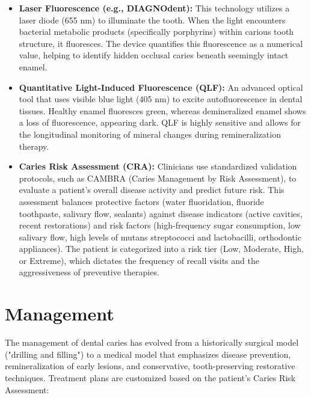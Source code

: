 \begin{itemize}
\begin{itemize}
    \end{itemize}
    \item \textbf{Laser Fluorescence (e.g., DIAGNOdent):} This technology utilizes a laser diode (655 nm) to illuminate the tooth. When the light encounters bacterial metabolic products (specifically porphyrins) within carious tooth structure, it fluoresces. The device quantifies this fluorescence as a numerical value, helping to identify hidden occlusal caries beneath seemingly intact enamel.
    \item \textbf{Quantitative Light-Induced Fluorescence (QLF):} An advanced optical tool that uses visible blue light (405 nm) to excite autofluorescence in dental tissues. Healthy enamel fluoresces green, whereas demineralized enamel shows a loss of fluorescence, appearing dark. QLF is highly sensitive and allows for the longitudinal monitoring of mineral changes during remineralization therapy.
    \item \textbf{Caries Risk Assessment (CRA):} Clinicians use standardized validation protocols, such as CAMBRA (Caries Management by Risk Assessment), to evaluate a patient's overall disease activity and predict future risk. This assessment balances protective factors (water fluoridation, fluoride toothpaste, salivary flow, sealants) against disease indicators (active cavities, recent restorations) and risk factors (high-frequency sugar consumption, low salivary flow, high levels of mutans streptococci and lactobacilli, orthodontic appliances). The patient is categorized into a risk tier (Low, Moderate, High, or Extreme), which dictates the frequency of recall visits and the aggressiveness of preventive therapies.
\end{itemize}

\section*{Management}
The management of dental caries has evolved from a historically surgical model ("drilling and filling") to a medical model that emphasizes disease prevention, remineralization of early lesions, and conservative, tooth-preserving restorative techniques. Treatment plans are customized based on the patient's Caries Risk Assessment:

